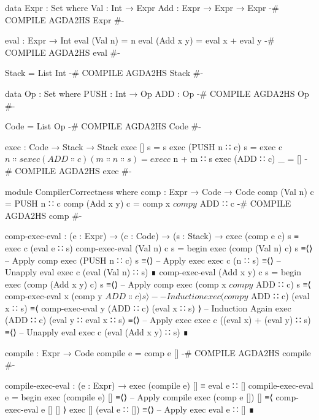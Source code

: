 \documentclass{article}
\begin{document}
\begin{code}
data Expr : Set where
    Val : Int → Expr
    Add : Expr → Expr → Expr
{-# COMPILE AGDA2HS Expr #-}
\end{code}
\begin{code}
eval : Expr → Int
eval (Val n) = n
eval (Add x y) = eval x + eval y
{-# COMPILE AGDA2HS eval #-}
\end{code}
\begin{code}
Stack = List Int
{-# COMPILE AGDA2HS Stack #-}
\end{code}
\begin{code}
data Op : Set where
    PUSH : Int → Op
    ADD : Op
{-# COMPILE AGDA2HS Op #-}
\end{code}
\begin{code}
Code = List Op
{-# COMPILE AGDA2HS Code #-}
\end{code}
\begin{code}
exec : Code → Stack → Stack
exec [] s = s
exec (PUSH n ∷ c) s = exec c $ n ∷ s
exec (ADD ∷ c) (m ∷ n ∷ s) = exec c $ n + m ∷ s
exec (ADD ∷ c) _ = []
{-# COMPILE AGDA2HS exec #-}
\end{code}
\begin{code}
module CompilerCorrectness where
  comp : Expr → Code → Code
  comp (Val n) c = PUSH n ∷ c
  comp (Add x y) c = comp x $ comp y $ ADD ∷ c
  {-# COMPILE AGDA2HS comp #-}
\end{code}
\begin{code}
  comp-exec-eval : (e : Expr) → (c : Code) → (s : Stack)
      → exec (comp e c) s ≡ exec c (eval e ∷ s)
  comp-exec-eval (Val n) c s =
    begin
      exec (comp (Val n) c) s
    ≡⟨⟩ -- Apply comp
      exec (PUSH n ∷ c) s
    ≡⟨⟩ -- Apply exec
      exec c (n ∷ s)
    ≡⟨⟩ -- Unapply eval
      exec c (eval (Val n) ∷ s)
    ∎
  comp-exec-eval (Add x y) c s =
    begin
      exec (comp (Add x y) c) s
    ≡⟨⟩ -- Apply comp
      exec (comp x $ comp y $ ADD ∷ c) s
    ≡⟨ comp-exec-eval x (comp y $ ADD ∷ c) s ⟩ -- Induction
      exec (comp y $ ADD ∷ c) (eval x ∷ s)
    ≡⟨ comp-exec-eval y (ADD ∷ c) (eval x ∷ s) ⟩ -- Induction Again
      exec (ADD ∷ c) (eval y ∷ eval x ∷ s)
    ≡⟨⟩ -- Apply exec
      exec c ((eval x) + (eval y) ∷ s)
    ≡⟨⟩ -- Unapply eval
      exec c (eval (Add x y) ∷ s)
    ∎
\end{code}
\begin{code}
  compile : Expr → Code
  compile e = comp e []
  {-# COMPILE AGDA2HS compile #-}
\end{code}
\begin{code}
  compile-exec-eval : (e : Expr) → exec (compile e) [] ≡ eval e ∷ []
  compile-exec-eval e =
    begin
      exec (compile e) []
    ≡⟨⟩ -- Apply compile
      exec (comp e []) []
    ≡⟨ comp-exec-eval e [] [] ⟩
      exec [] (eval e ∷ [])
    ≡⟨⟩ -- Apply exec
      eval e ∷ []
    ∎
\end{code}
\end{document}
